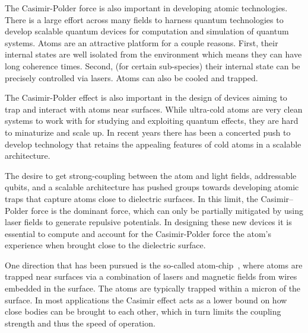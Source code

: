 The Casimir-Polder force is also important in developing atomic technologies.  
There is a large effort across many fields to harness quantum technologies to develop scalable 
quantum devices for computation and simulation of quantum systems.  
Atoms are an attractive platform for a couple reasons.  
First, their internal states are well isolated from the environment which means they can have long coherence times.
Second, (for certain sub-species) their internal state can be precisely controlled via lasers.  
Atoms can also be cooled and trapped.  


The Casimir-Polder effect is also important in the design of devices aiming to trap and interact
with atoms near surfaces.  While ultra-cold atoms are very clean systems to work with for 
studying and exploiting quantum effects, they are hard to minaturize and scale up.  In recent
years there has been a concerted push to develop technology that retains the appealing features 
of cold atoms in a scalable architecture. 

The desire to get strong-coupling between the atom and light fields, addressable qubits, and a scalable
architecture has pushed groups towards developing atomic traps that capture atoms close to dielectric surfaces.  
In this limit, the Casimir--Polder force is the dominant force, which can only be partially mitigated
by using laser fields to generate repulsive potentials.
In designing these new devices it is essential to compute and account for the Casimir-Polder force
the atom's experience when brought close to the dielectric surface.  

    One direction that has been pursued is the so-called atom-chip~\cite{Folman2000,Schneider2003},
    where atoms are trapped near surfaces via a combination of lasers and magnetic fields from wires embedded in
    the surface.  The atoms are typically trapped within a micron of the surface.  
    In most applications the Casimir effect acts as a lower bound on how close bodies can be brought 
    to each other, which in turn limits the coupling strength and thus the speed of operation.  

